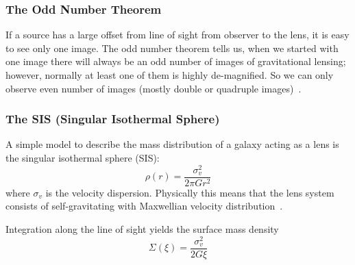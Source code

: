 %

\subsubsection{The Odd Number Theorem}
If a source has a large offset from line of sight from observer to the lens, it is easy to see only one image. The odd number theorem tells us, when we started with one image there will always be an odd number of images of gravitational lensing; however, normally at least one of them is highly de-magnified. So we can only observe even number of images (mostly double or quadruple images)~\cite{manual}.

\subsubsection{The SIS (Singular Isothermal Sphere)}
A simple model to describe the mass distribution of a galaxy acting as a lens is the singular isothermal sphere (SIS):
\begin{equation}
\rho(r)=\frac{\sigma_{v}^{2}}{2\pi G r^2}
\label{equ:SIS}
\end{equation}
where $ \sigma_{v} $ is the velocity dispersion. Physically this means that the lens system consists of self-gravitating with Maxwellian velocity distribution~\cite{Schneider}.

Integration along the line of sight yields the surface mass density
\begin{equation}
\Sigma(\xi)=\frac{\sigma^2_{v}}{2G\xi}
\label{equ:Sigma(xi)}
\end{equation}

